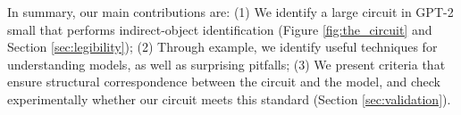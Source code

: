 In summary, our main contributions are: (1) We identify a large circuit in GPT-2 small that performs indirect-object identification (Figure \ref{fig:the_circuit} and Section \ref{sec:legibility}); (2) Through example, we identify useful techniques for understanding models, as well as surprising pitfalls;  (3) We present criteria that ensure structural correspondence between the circuit and the model, and check experimentally whether our circuit meets this standard (Section \ref{sec:validation}).





